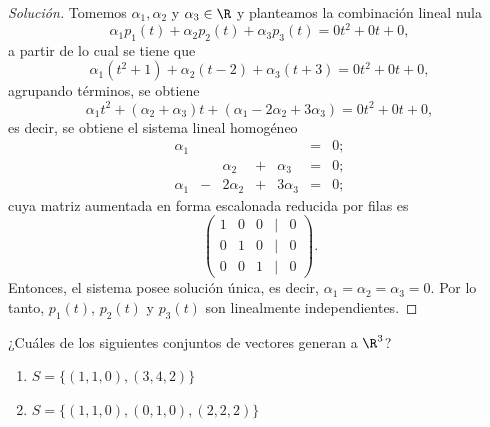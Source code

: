\documentclass[a4,11pt]{aleph-notas}
\begin{document}
\begin{proof}[Solución]\hspace{0pt}
    Tomemos $\alpha_1, \alpha_2$ y $\alpha_3\in\R$ y planteamos la combinación lineal nula
    \[
        \alpha_1 p_1(t) + \alpha_2 p_2(t) + \alpha_3 p_3(t) = 0t^2 + 0t + 0,
    \]
    a partir de lo cual se tiene que
    \[
        \alpha_1(t^2 + 1) + \alpha_2(t - 2) + \alpha_3(t + 3) = 0t^2 + 0t + 0,
    \]
    agrupando términos, se obtiene
    \[
        \alpha_1t^2 + (\alpha_2 + \alpha_3)t + (\alpha_1 - 2\alpha_2 + 3\alpha_3) = 0t^2 + 0t + 0,
    \]
    es decir, se obtiene el sistema lineal homogéneo
    \[
        \begin{array}{ccccccc}
            \alpha_1 &  &  &  & & = & 0;\\
             &  & \alpha_2 & + & \alpha_3& = & 0;\\
            \alpha_1 & - & 2\alpha_2 & + & 3\alpha_3& = & 0;
        \end{array}
    \]
    cuya matriz aumentada en forma escalonada reducida por filas es
    \[
        \begin{pmatrix}
            1 & 0 & 0 & | & 0\\
            0 & 1 & 0 & | & 0\\
            0 & 0 & 1 & | & 0
        \end{pmatrix}.
    \]
    Entonces, el sistema posee solución única, es decir, $\alpha_1 = \alpha_2 = \alpha_3 = 0$. Por lo tanto, $p_1(t)$, $p_2(t)$ y $p_3(t)$ son linealmente independientes.
\end{proof}

\begin{ejer}
    ¿Cuáles de los siguientes conjuntos de vectores generan a $\R^3$?
\begin{enumerate}
        \item $S=\{(1, 1, 0), (3, 4, 2)\}$
        \item $S=\{(1, 1, 0), (0, 1, 0), (2, 2, 2)\}$
\end{enumerate}
\end{ejer}
\end{document}
